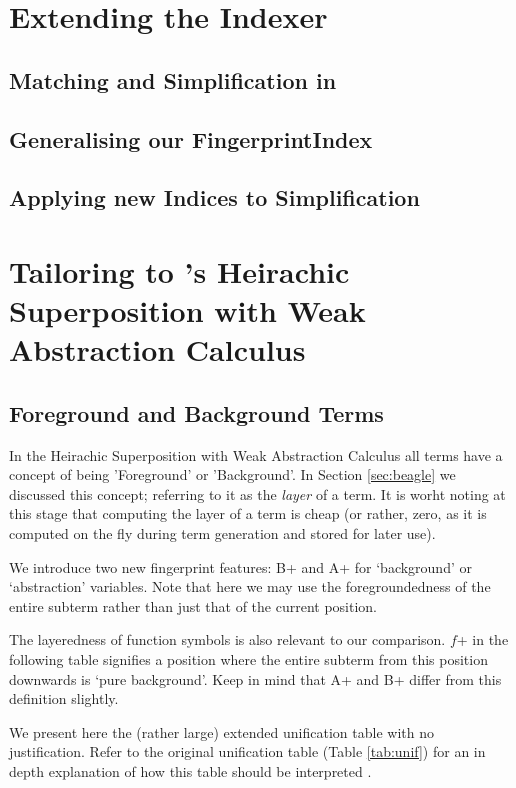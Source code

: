 \section{Extending the Indexer}

\subsection{Matching and Simplification in \Beagle}

\subsection{Generalising our FingerprintIndex}

\subsection{Applying new Indices to Simplification}

\section{Tailoring to \Beagle's Heirachic Superposition with Weak Abstraction Calculus}
\label{sec:tailored}

\subsection{Foreground and Background Terms}

In the Heirachic Superposition with Weak Abstraction Calculus all terms have 
a concept of being 'Foreground' or 'Background'. In Section \ref{sec:beagle} we
discussed this concept; referring to it as the \emph{layer} of a term. It is
worht noting at this stage that computing the layer of a term is cheap (or rather,
zero, as it is computed on the fly during term generation and stored for later use).

We introduce two new fingerprint features: B+ and A+ for `background' or `abstraction' variables.
Note that here we may use the foregroundedness of the entire subterm rather than just that
of the current position.

The layeredness of function symbols is also relevant to our comparison.
$f$+ in the following table signifies a position where the entire subterm from this position downwards
is `pure background'. Keep in mind that A+ and B+ differ from this definition slightly.

We present here the (rather large) extended unification table with no justification.
Refer to the original unification table (Table \ref{tab:unif}) for an in depth
explanation of how this table should be interpreted \cite{shulz12}.

